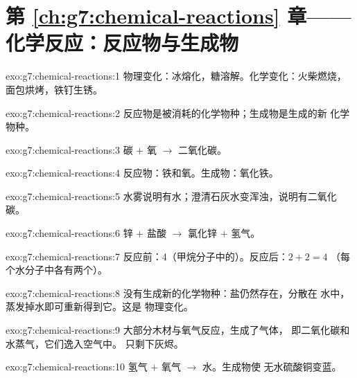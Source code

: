 \section*{第 \ref{ch:g7:chemical-reactions} 章——化学反应：反应物与生成物}

\begin{solution}{exo:g7:chemical-reactions:1}
物理变化：冰熔化，糖溶解。化学变化：火柴燃烧，
面包烘烤，铁钉生锈。
\end{solution}

\begin{solution}{exo:g7:chemical-reactions:2}
反应物是被消耗的化学物种；生成物是生成的新
化学物种。
\end{solution}

\begin{solution}{exo:g7:chemical-reactions:3}
碳 $+$ 氧 $\longrightarrow$ 二氧化碳。
\end{solution}

\begin{solution}{exo:g7:chemical-reactions:4}
反应物：铁和氧。生成物：氧化铁。
\end{solution}

\begin{solution}{exo:g7:chemical-reactions:5}
水雾说明有水；澄清石灰水变浑浊，说明有二氧化碳。
\end{solution}

\begin{solution}{exo:g7:chemical-reactions:6}
锌 $+$ 盐酸 $\longrightarrow$ 氯化锌 $+$ 氢气。
\end{solution}

\begin{solution}{exo:g7:chemical-reactions:7}
反应前：4（甲烷分子中的）。反应后：$2 + 2 = 4$
（每个水分子中各有两个）。
\end{solution}

\begin{solution}{exo:g7:chemical-reactions:8}
没有生成新的化学物种：盐仍然存在，分散在
水中，蒸发掉水即可重新得到它。这是
物理变化。
\end{solution}

\begin{solution}{exo:g7:chemical-reactions:9}
大部分木材与氧气反应，生成了气体，
即二氧化碳和水蒸气，它们逸入空气中。
只剩下灰烬。
\end{solution}

\begin{solution}{exo:g7:chemical-reactions:10}
氢气 $+$ 氧气 $\longrightarrow$ 水。生成物使
无水硫酸铜变蓝。
\end{solution}

